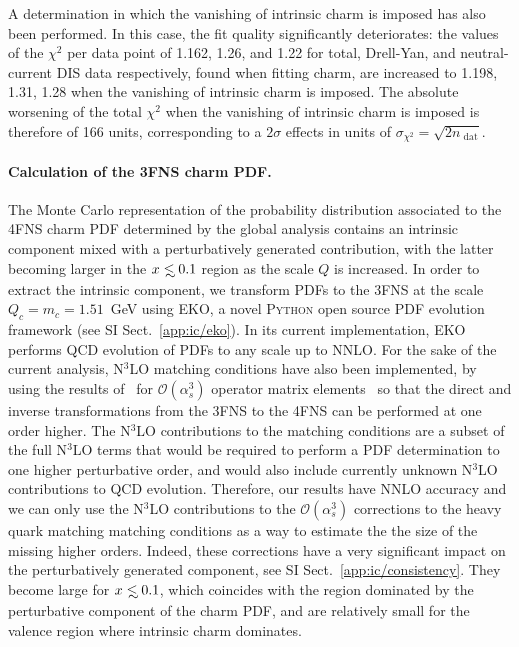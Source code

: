 A determination in which the vanishing of intrinsic charm is
imposed has also been performed.
%
In this case, the fit quality significantly
deteriorates: the values of the $\chi^2$ per data point of 1.162,
1.26, and 1.22 for total, Drell-Yan, 
and neutral-current DIS data respectively, found when fitting charm, are 
increased to 1.198, 1.31, 1.28 when the vanishing of intrinsic charm
is imposed.
%
The absolute worsening of the total $\chi^2$ when the vanishing of intrinsic charm is imposed is therefore
of 166 units, corresponding to
a $2\sigma$ effects in units of $\sigma_{\chi^2}= \sqrt{2n_\textrm{ dat}}$.

\paragraph{Calculation of the 3FNS charm PDF.}
%
The Monte Carlo representation of the probability distribution associated to
the 4FNS charm PDF determined by the global
analysis contains an intrinsic component mixed with a perturbatively
generated contribution, with the latter
becoming larger in the $x\lsim 0.1$ region as the scale $Q$ is increased.
%
In order to extract the intrinsic component, 
we transform PDFs to the 3FNS at the scale $Q_c=m_c=1.51$~GeV using
\textsc{\small EKO}, a novel \textsc{\small Python} open source
PDF evolution framework (see  SI Sect.~\ref{app:ic/eko}).
%
In its current implementation, \textsc{\small EKO} performs  QCD 
evolution of PDFs to any scale
up to NNLO. For
the sake of the current analysis, N$^3$LO matching conditions have also
been implemented, by 
using  the results
of~\cite{Bierenbaum:2009zt,Bierenbaum:2009mv,Ablinger:2010ty,Ablinger:2014vwa,Ablinger:2014uka,Behring:2014eya,Ablinger_2014,Ablinger:2014nga,Blumlein:2017wxd}
for $\mathcal{O}(\alpha_s^3)$ operator matrix elements~
so that the direct and inverse transformations from the 3FNS to the
4FNS can be performed at one order
higher.
%
The N$^3$LO contributions to the matching conditions are a subset of
the full N$^3$LO terms that would be required to perform a PDF determination
 to one higher perturbative order, and would
also include currently unknown
N$^3$LO contributions to QCD evolution. Therefore, our results have 
NNLO accuracy and we can only use the  N$^3$LO contributions to the
 $\mathcal{O}(\alpha_s^3)$ corrections to the
heavy quark matching
matching conditions as a way to estimate the 
the size of the missing higher orders. 
Indeed, these corrections have a very 
significant impact on the
perturbatively generated component, see SI Sect.~\ref{app:ic/consistency}.
%
They become large for $x \lsim 0.1$, which coincides with the region
dominated by the perturbative component of the charm PDF,
  and are relatively small for the valence region
  where intrinsic charm dominates.
  
